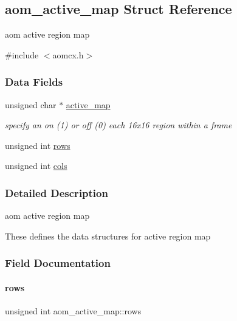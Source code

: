 \hypertarget{structaom__active__map}{}\subsection{aom\+\_\+active\+\_\+map Struct Reference}
\label{structaom__active__map}


aom active region map  




{\ttfamily \#include $<$aomcx.\+h$>$}

\subsubsection*{Data Fields}
\begin{DoxyCompactItemize}
\item 
\mbox{\label{structaom__active__map_a8916917bce716b1d954a9f476d98142e}} 
unsigned char $\ast$ \hyperlink{structaom__active__map_a8916917bce716b1d954a9f476d98142e}{active\+\_\+map}
\begin{DoxyCompactList}\small\item\em specify an on (1) or off (0) each 16x16 region within a frame \end{DoxyCompactList}\item 
unsigned int \hyperlink{structaom__active__map_a0d7ce0e1050137bf9b88e8649ea7aec2}{rows}
\item 
unsigned int \hyperlink{structaom__active__map_a3a105e0d8f2643cdc542e2f078b9e6b2}{cols}
\end{DoxyCompactItemize}


\subsubsection{Detailed Description}
aom active region map 

These defines the data structures for active region map 

\subsubsection{Field Documentation}
\mbox{\label{structaom__active__map_a0d7ce0e1050137bf9b88e8649ea7aec2}} 
\paragraph{\texorpdfstring{rows}{rows}}
{\footnotesize\ttfamily unsigned int aom\+\_\+active\+\_\+map\+::rows}

